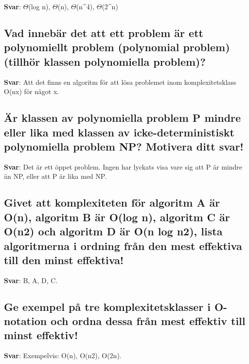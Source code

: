 \documentclass[a4paper,11pt,oneside]{article}
\begin{document}
\begin{sloppypar}
\label{q:334:sa:sv:True}

\textbf{Svar}: \ensuremath{\Theta}(log n), \ensuremath{\Theta}(n), \ensuremath{\Theta}(n^4), \ensuremath{\Theta}(2^n)



\subsection{Vad inneb\"ar det att ett problem \"ar ett polynomiellt problem (polynomial problem) (tillh\"or klassen polynomiella problem)?}

\label{q:335:sa:sv:True}

\textbf{Svar}: Att det finns en algoritm f\"or att l\"osa problemet inom komplexitetsklass O(nx) f\"or n\r{a}got x.



\subsection{\"Ar klassen av polynomiella problem P mindre eller lika med klassen av icke-deterministiskt polynomiella problem NP? Motivera ditt svar!}

\label{q:336:sa:sv:True}

\textbf{Svar}: Det \"ar ett \"oppet problem. Ingen har lyckats visa vare sig att P \"ar mindre \"an NP, eller att P \"ar lika med NP.



\subsection{Givet att komplexiteten f\"or algoritm A \"ar O(n), algoritm B \"ar O(log n), algoritm C \"ar O(n2) och algoritm D \"ar O(n log n2), lista algoritmerna i ordning fr\r{a}n den mest effektiva till den minst effektiva!}

\label{q:337:sa:sv:True}

\textbf{Svar}: B, A, D, C.



\subsection{Ge exempel p\r{a} tre komplexitetsklasser i O-notation och ordna dessa fr\r{a}n mest effektiv till minst effektiv!}

\label{q:338:sa:sv:True}

\textbf{Svar}: Exempelvis: O(n), O(n2), O(2n).




\end{sloppypar}
\end{document}
